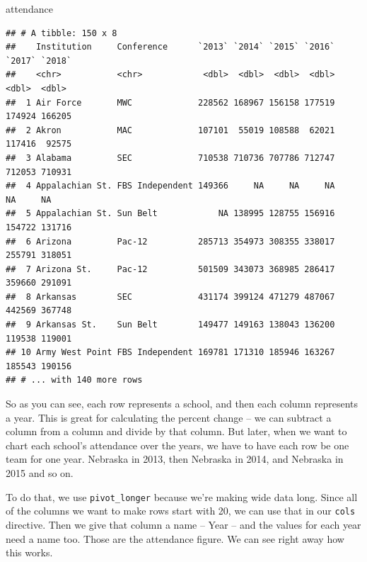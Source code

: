 \documentclass[
]{book}
\newenvironment{Shaded}{\begin{snugshade}}{\end{snugshade}}
\newcommand{\DataTypeTok}[1]{\textcolor[rgb]{0.13,0.29,0.53}{#1}}
\newcommand{\KeywordTok}[1]{\textcolor[rgb]{0.13,0.29,0.53}{\textbf{#1}}}
\newcommand{\NormalTok}[1]{#1}
\newcommand{\OperatorTok}[1]{\textcolor[rgb]{0.81,0.36,0.00}{\textbf{#1}}}
\newcommand{\StringTok}[1]{\textcolor[rgb]{0.31,0.60,0.02}{#1}}
\begin{document}
\begin{Shaded}
\begin{Highlighting}[]
\NormalTok{attendance}
\end{Highlighting}
\end{Shaded}

\begin{verbatim}
## # A tibble: 150 x 8
##    Institution     Conference      `2013` `2014` `2015` `2016` `2017` `2018`
##    <chr>           <chr>            <dbl>  <dbl>  <dbl>  <dbl>  <dbl>  <dbl>
##  1 Air Force       MWC             228562 168967 156158 177519 174924 166205
##  2 Akron           MAC             107101  55019 108588  62021 117416  92575
##  3 Alabama         SEC             710538 710736 707786 712747 712053 710931
##  4 Appalachian St. FBS Independent 149366     NA     NA     NA     NA     NA
##  5 Appalachian St. Sun Belt            NA 138995 128755 156916 154722 131716
##  6 Arizona         Pac-12          285713 354973 308355 338017 255791 318051
##  7 Arizona St.     Pac-12          501509 343073 368985 286417 359660 291091
##  8 Arkansas        SEC             431174 399124 471279 487067 442569 367748
##  9 Arkansas St.    Sun Belt        149477 149163 138043 136200 119538 119001
## 10 Army West Point FBS Independent 169781 171310 185946 163267 185543 190156
## # ... with 140 more rows
\end{verbatim}

So as you can see, each row represents a school, and then each column represents a year. This is great for calculating the percent change -- we can subtract a column from a column and divide by that column. But later, when we want to chart each school's attendance over the years, we have to have each row be one team for one year. Nebraska in 2013, then Nebraska in 2014, and Nebraska in 2015 and so on.

To do that, we use \texttt{pivot\_longer} because we're making wide data long. Since all of the columns we want to make rows start with 20, we can use that in our \texttt{cols} directive. Then we give that column a name -- Year -- and the values for each year need a name too. Those are the attendance figure. We can see right away how this works.

\begin{Shaded}
\end{Shaded}
\end{document}
